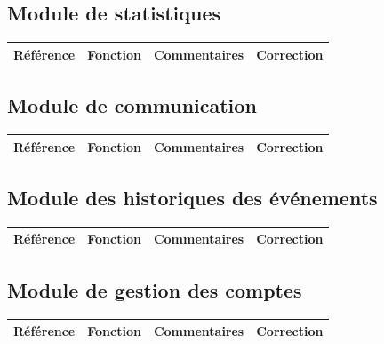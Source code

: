 \documentclass[10pt,a4paper,landscape]{report}
\begin{document}
\subsection{Module de statistiques}

\begin{center}
	\bgroup
	\def\arraystretch{1.5}
	\begin{tabular}{|p{2.5cm}|p{8cm}|p{8cm}|p{8cm}|}
		\hline
		\rowcolor{gris}Référence & Fonction & Commentaires & Correction\\
		\hline
		
		\hline
	\end{tabular}
	\egroup
\end{center}


\subsection{Module de communication}

\begin{center}
	\bgroup
	\def\arraystretch{1.5}
	\begin{tabular}{|p{2.5cm}|p{8cm}|p{8cm}|p{8cm}|}
		\hline
		\rowcolor{gris}Référence & Fonction & Commentaires & Correction\\
		\hline
		
		\hline
	\end{tabular}
	\egroup
\end{center}


\subsection{Module des historiques des événements}

\begin{center}
	\bgroup
	\def\arraystretch{1.5}
	\begin{tabular}{|p{2.5cm}|p{8cm}|p{8cm}|p{8cm}|}
		\hline
		\rowcolor{gris}Référence & Fonction & Commentaires & Correction\\
		\hline
		
		\hline
	\end{tabular}
	\egroup
\end{center}


\subsection{Module de gestion des comptes}

\begin{center}
	\bgroup
	\def\arraystretch{1.5}
	\begin{tabular}{|p{2.5cm}|p{8cm}|p{8cm}|p{8cm}|}
		\hline
		\rowcolor{gris}Référence & Fonction & Commentaires & Correction\\
		\hline
		
		\hline
	\end{tabular}
	\egroup
\end{center}
\end{document}
